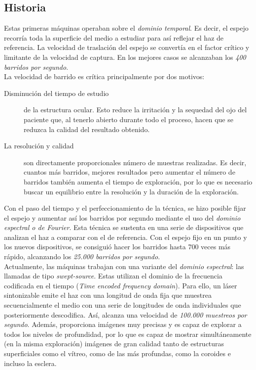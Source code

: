 \subsection{Historia}
Estas primeras máquinas operaban sobre el \emph{dominio temporal}. Es
decir, el espejo recorría toda la superficie del medio a estudiar para
así reflejar el haz de referencia. La velocidad de traslación del
espejo se convertía en el factor crítico y limitante de la velocidad
de
captura. En los mejores casos se alcanzaban los \emph{400 barridos por segundo}.\\
La velocidad de barrido es crítica principalmente por dos motivos:
\begin{description}
\item [Disminución del tiempo de estudio] de la estructura
  ocular. Esto reduce la irritación y la sequedad del ojo del paciente
  que, al tenerlo abierto durante todo el proceso, hacen que se
  reduzca la calidad del resultado obtenido.
\item [La resolución y calidad] son directamente proporcionales número
  de muestras realizadas. Es decir, cuantos más barridos, mejores
  resultados pero aumentar el número de barridos también aumenta el
  tiempo de exploración, por lo que es necesario buscar un equilibrio
  entre la resolución y la duración de la exploración.
\end{description}
Con el paso del tiempo y el perfeccionamiento de la técnica, se hizo
posible fijar el espejo y aumentar así los barridos por segundo
mediante el uso del \emph{dominio espectral o de Fourier}. Esta
técnica se sustenta en una serie de dispositivos que analizan el haz a
comparar con el de referencia. Con el espejo fijo en un punto y los
nuevos dispositivos, se consiguió hacer los barridos hasta 700 veces
más rápido, alcanzando los \emph{25.000 barridos por segundo}.\\
Actualmente, las máquinas trabajan con una variante del \emph{dominio
  espectral}: las llamadas de tipo \emph{swept-source}. Estas utilizan
el dominio de la frecuencia codificada en el tiempo (\emph{Time
  encoded frequency domain}). Para ello, un láser sintonizable emite
el haz con una longitud de onda fija que muestrea secuencialmente el
medio con una serie de longitudes de onda individuales que
posteriormente descodifica. Así, alcanza una velocidad de
\emph{100.000 muestreos por segundo}. Además, proporciona imágenes muy
precisas y es capaz de explorar a todos los niveles de profundidad,
por lo que es capaz de mostrar simultáneamente (en la misma
exploración) imágenes de gran calidad tanto de estructuras
superficiales como el vítreo, como de las más profundas, como la
\gls{coroides} e incluso la esclera.

